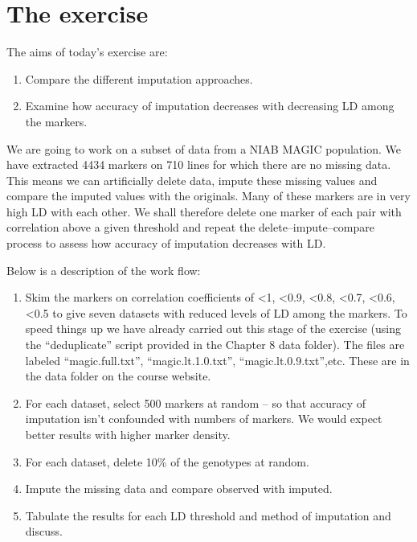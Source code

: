 \documentclass[
]{book}
\begin{document}
\hypertarget{the-exercise-1}{%
\section{The exercise}\label{the-exercise-1}}

The aims of today's exercise are:

\begin{enumerate}
\def\labelenumi{\arabic{enumi}.}
\item
  Compare the different imputation approaches.
\item
  Examine how accuracy of imputation decreases with decreasing LD among the markers.
\end{enumerate}

We are going to work on a subset of data from a NIAB MAGIC population. We have extracted 4434 markers on 710 lines for which there are no missing data. This means we can artificially delete data, impute these missing values and compare the imputed values with the originals. Many of these markers are in very high LD with each other. We shall therefore delete one marker of each pair with correlation above a given threshold and repeat the delete--impute--compare process to assess how accuracy of imputation decreases with LD.

Below is a description of the work flow:

\begin{enumerate}
\def\labelenumi{\arabic{enumi}.}
\item
  Skim the markers on correlation coefficients of \textless1, \textless0.9, \textless0.8, \textless0.7, \textless0.6, \textless0.5 to give seven datasets with reduced levels of LD among the markers. To speed things up we have already carried out this stage of the exercise (using the ``deduplicate'' script provided in the Chapter 8 data folder). The files are labeled ``magic.full.txt'', ``magic.lt.1.0.txt'', ``magic.lt.0.9.txt'',etc. These are in the data folder on the course website.
\item
  For each dataset, select 500 markers at random -- so that accuracy of imputation isn't confounded with numbers of markers. We would expect better results with higher marker density.
\item
  For each dataset, delete 10\% of the genotypes at random.
\item
  Impute the missing data and compare observed with imputed.
\item
  Tabulate the results for each LD threshold and method of imputation and discuss.
\end{enumerate}
\end{document}
